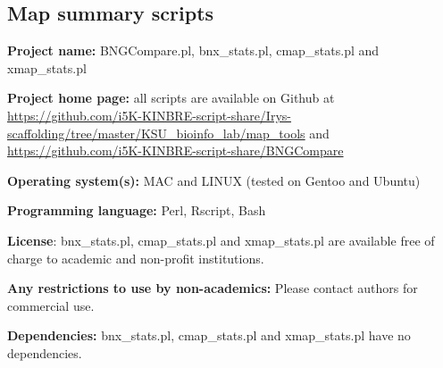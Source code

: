\documentclass{bmcart}
\begin{document}
\subsection*{\textbf{Map summary scripts}}

\textbf{Project name:} BNGCompare.pl, bnx\_stats.pl, cmap\_stats.pl and xmap\_stats.pl

\textbf{Project home page:} all scripts are available on Github at \url{https://github.com/i5K-KINBRE-script-share/Irys-scaffolding/tree/master/KSU\_bioinfo\_lab/map\_tools} and \url{https://github.com/i5K-KINBRE-script-share/BNGCompare}

\textbf{Operating system(s):} MAC and LINUX (tested on Gentoo and Ubuntu)

\textbf{Programming language:} Perl, Rscript, Bash

\textbf{License}: bnx\_stats.pl, cmap\_stats.pl and xmap\_stats.pl are available free of charge to academic and non-profit institutions.

\textbf{Any restrictions to use by non-academics:} Please contact authors for commercial use.

\textbf{Dependencies:} bnx\_stats.pl, cmap\_stats.pl and xmap\_stats.pl have no dependencies.

\end{document}
